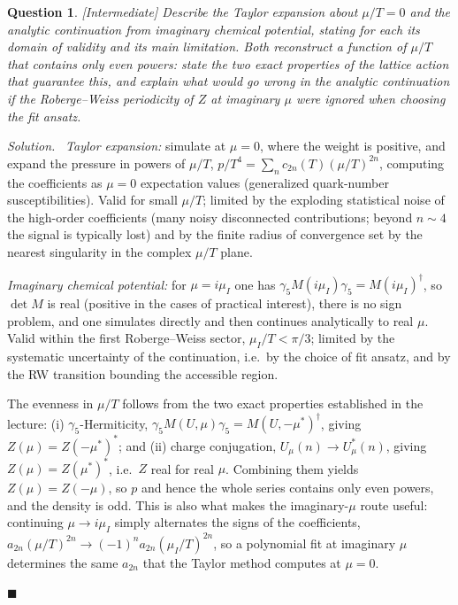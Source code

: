 \documentclass[11pt]{article}
\newcommand{\diff}[1]{\textcolor{blue!60!black}{\footnotesize\textsf{[#1]}}\quad}
\newtheorem{question}{Question}
\newenvironment{solution}{\par\smallskip\noindent\textit{Solution.}\ }{\hfill$\blacksquare$\par\smallskip}
\begin{document}
\begin{question}
\diff{Intermediate} Describe the Taylor expansion about $\mu/T=0$ and the analytic continuation from imaginary chemical potential, stating for each its domain of validity and its main limitation. Both reconstruct a function of $\mu/T$ that contains only \emph{even} powers: state the two exact properties of the lattice action that guarantee this, and explain what would go wrong in the analytic continuation if the Roberge--Weiss periodicity of $Z$ at imaginary $\mu$ were ignored when choosing the fit ansatz.
\end{question}
\begin{solution}
\emph{Taylor expansion:} simulate at $\mu = 0$, where the weight is positive, and expand the pressure in powers of $\mu/T$, $p/T^4 = \sum_n c_{2n}(T)(\mu/T)^{2n}$, computing the coefficients as $\mu=0$ expectation values (generalized quark-number susceptibilities). Valid for small $\mu/T$; limited by the exploding statistical noise of the high-order coefficients (many noisy disconnected contributions; beyond $n\sim4$ the signal is typically lost) and by the finite radius of convergence set by the nearest singularity in the complex $\mu/T$ plane.

\emph{Imaginary chemical potential:} for $\mu = i\mu_I$ one has $\gamma_5 M(i\mu_I)\gamma_5 = M(i\mu_I)^\dagger$, so $\det M$ is real (positive in the cases of practical interest), there is no sign problem, and one simulates directly and then continues analytically to real $\mu$. Valid within the first Roberge--Weiss sector, $\mu_I/T < \pi/3$; limited by the systematic uncertainty of the continuation, i.e.\ by the choice of fit ansatz, and by the RW transition bounding the accessible region.

The evenness in $\mu/T$ follows from the two exact properties established in the lecture: (i) $\gamma_5$-Hermiticity, $\gamma_5 M(U,\mu)\gamma_5 = M(U,-\mu^*)^\dagger$, giving $Z(\mu) = Z(-\mu^*)^*$; and (ii) charge conjugation, $U_\mu(n)\to U_\mu^*(n)$, giving $Z(\mu) = Z(\mu^*)^*$, i.e.\ $Z$ real for real $\mu$. Combining them yields $Z(\mu) = Z(-\mu)$, so $p$ and hence the whole series contains only even powers, and the density is odd. This is also what makes the imaginary-$\mu$ route useful: continuing $\mu \to i\mu_I$ simply alternates the signs of the coefficients, $a_{2n}(\mu/T)^{2n} \to (-1)^n a_{2n}(\mu_I/T)^{2n}$, so a polynomial fit at imaginary $\mu$ determines the same $a_{2n}$ that the Taylor method computes at $\mu = 0$.


\end{solution}
\end{document}
